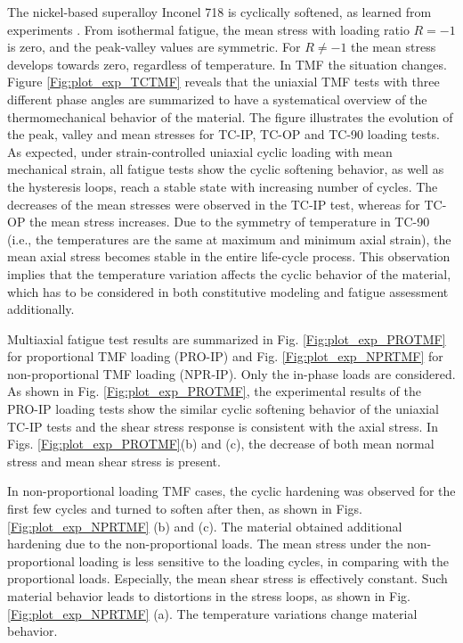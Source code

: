 \documentclass[preprint,5p,twocolumn,11pt,sort&compress]{elsarticle}
\begin{document}
The nickel-based superalloy Inconel 718 is cyclically softened, as learned from experiments \cite{Koch85, Morrow88, Socie2000}. From isothermal fatigue, the mean stress with loading ratio $R=-1$ is zero, and the peak-valley values are symmetric. For $R\ne -1$ the mean stress develops towards zero, regardless of temperature. In TMF the situation changes. Figure \ref{Fig:plot_exp_TCTMF} reveals that the uniaxial TMF tests with three different phase angles are summarized to have a systematical overview of the thermomechanical behavior of the material.  The figure illustrates the evolution of the peak, valley and mean stresses for TC-IP, TC-OP and TC-90 loading tests. As expected, under strain-controlled uniaxial cyclic loading with mean mechanical strain, all fatigue tests show the cyclic softening behavior, as well as the hysteresis loops, reach a stable state with increasing number of cycles. The decreases of the mean stresses were observed in the TC-IP test, whereas for TC-OP the mean stress increases. Due to the symmetry of temperature in TC-90 (i.e., the temperatures are the same at maximum and minimum axial strain), the mean axial stress becomes stable in the entire life-cycle process. This observation implies that the temperature variation affects the cyclic behavior of the material, which has to be considered in both constitutive modeling and fatigue assessment additionally.

Multiaxial fatigue test results are summarized in Fig. \ref{Fig:plot_exp_PROTMF} for proportional TMF loading (PRO-IP) and Fig. \ref{Fig:plot_exp_NPRTMF} for non-proportional TMF loading (NPR-IP). Only the in-phase loads are considered. 
As shown in Fig. \ref{Fig:plot_exp_PROTMF}, the experimental results of the PRO-IP loading tests show the similar cyclic softening behavior of the uniaxial TC-IP tests and the shear stress response is consistent with the axial stress. In Figs. \ref{Fig:plot_exp_PROTMF}(b) and (c), the decrease of both mean normal stress and mean shear stress is present.

In non-proportional loading TMF cases, the cyclic hardening was observed for the first few cycles and turned to soften after then, as shown in Figs. \ref{Fig:plot_exp_NPRTMF} (b) and (c). The material obtained additional hardening due to the non-proportional loads. The mean stress under the non-proportional loading is less sensitive to the loading cycles, in comparing with the proportional loads. Especially, the mean shear stress is effectively constant. Such material behavior leads to distortions in the stress loops, as shown in Fig.  \ref{Fig:plot_exp_NPRTMF} (a). The temperature variations change material behavior.
\end{document}
